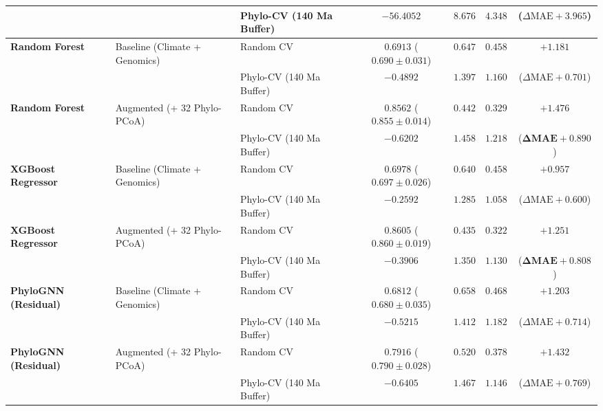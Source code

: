 \documentclass[sigconf,nonacm]{acmart}
\begin{document}
\begin{table}[t]
\begin{tabular}{lllcccc}
 & & Phylo-CV (140 Ma Buffer) & $-56.4052$ & $8.676$ & $4.348$ & \multicolumn{1}{c}{($\Delta\text{MAE} +3.965$)} \\
\midrule
\textbf{Random Forest} & Baseline (Climate + Genomics) & Random CV & $0.6913$ ($0.690 \pm 0.031$) & $0.647$ & $0.458$ & \multicolumn{1}{c}{$+1.181$} \\
 & & Phylo-CV (140 Ma Buffer) & $-0.4892$ & $1.397$ & $1.160$ & \multicolumn{1}{c}{($\Delta\text{MAE} +0.701$)} \\
\textbf{Random Forest} & Augmented (+ 32 Phylo-PCoA) & Random CV & $\mathbf{0.8562}$ ($0.855 \pm 0.014$) & $\mathbf{0.442}$ & $\mathbf{0.329}$ & \multicolumn{1}{c}{$\mathbf{+1.476}$} \\
 & & Phylo-CV (140 Ma Buffer) & $-0.6202$ & $1.458$ & $1.218$ & \multicolumn{1}{c}{($\mathbf{\Delta\text{MAE} +0.890}$)} \\
\midrule
\textbf{XGBoost Regressor} & Baseline (Climate + Genomics) & Random CV & $0.6978$ ($0.697 \pm 0.026$) & $0.640$ & $0.458$ & \multicolumn{1}{c}{$+0.957$} \\
 & & Phylo-CV (140 Ma Buffer) & $-0.2592$ & $1.285$ & $1.058$ & \multicolumn{1}{c}{($\Delta\text{MAE} +0.600$)} \\
\textbf{XGBoost Regressor} & Augmented (+ 32 Phylo-PCoA) & Random CV & $\mathbf{0.8605}$ ($0.860 \pm 0.019$) & $\mathbf{0.435}$ & $\mathbf{0.322}$ & \multicolumn{1}{c}{$\mathbf{+1.251}$} \\
 & & Phylo-CV (140 Ma Buffer) & $\mathbf{-0.3906}$ & $\mathbf{1.350}$ & $\mathbf{1.130}$ & \multicolumn{1}{c}{($\mathbf{\Delta\text{MAE} +0.808}$)} \\
\midrule
\textbf{PhyloGNN (Residual)} & Baseline (Climate + Genomics) & Random CV & $0.6812$ ($0.680 \pm 0.035$) & $0.658$ & $0.468$ & \multicolumn{1}{c}{$+1.203$} \\
 & & Phylo-CV (140 Ma Buffer) & $-0.5215$ & $1.412$ & $1.182$ & \multicolumn{1}{c}{($\Delta\text{MAE} +0.714$)} \\
\textbf{PhyloGNN (Residual)} & Augmented (+ 32 Phylo-PCoA) & Random CV & $0.7916$ ($0.790 \pm 0.028$) & $0.520$ & $0.378$ & \multicolumn{1}{c}{$+1.432$} \\
 & & Phylo-CV (140 Ma Buffer) & $-0.6405$ & $1.467$ & $1.146$ & \multicolumn{1}{c}{($\Delta\text{MAE} +0.769$)} \\
\bottomrule
\end{tabular}
\end{table}
\end{document}
